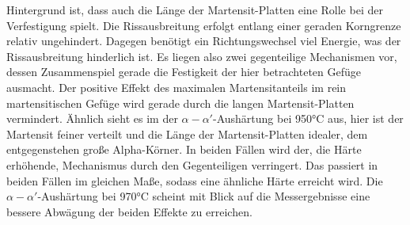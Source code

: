 \documentclass[a4paper, 11pt]{tubsreprt}
\begin{document}
Hintergrund ist, dass auch die Länge der Martensit-Platten eine Rolle bei der Verfestigung  spielt. Die Rissausbreitung erfolgt entlang einer geraden Korngrenze relativ ungehindert. Dagegen benötigt ein Richtungswechsel viel Energie, was der Rissausbreitung hinderlich ist. Es liegen also zwei gegenteilige Mechanismen vor, dessen Zusammenspiel gerade die Festigkeit der hier betrachteten Gefüge ausmacht. Der positive Effekt des maximalen Martensitanteils im rein martensitischen Gefüge wird gerade durch die langen Martensit-Platten vermindert. Ähnlich sieht es im der $\alpha-\alpha'$-Aushärtung bei 950°C aus, hier ist der Martensit feiner verteilt und die Länge der Martensit-Platten idealer, dem entgegenstehen große Alpha-Körner. In beiden Fällen wird der, die Härte erhöhende, Mechanismus durch den Gegenteiligen verringert. Das passiert in beiden Fällen im gleichen Maße, sodass eine ähnliche Härte erreicht wird. Die $\alpha-\alpha'$-Aushärtung bei 970°C scheint mit Blick auf die Messergebnisse eine bessere Abwägung der beiden Effekte zu erreichen. 
\end{document}
